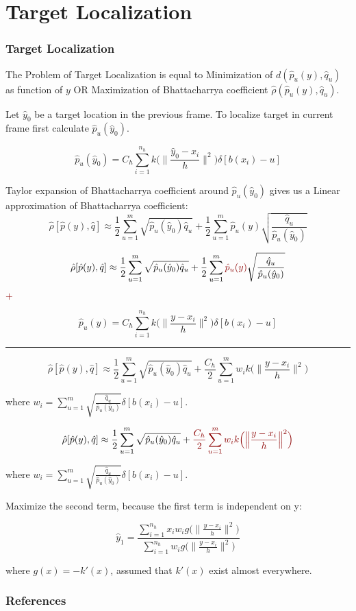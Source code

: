 \documentclass[hyperref={pdfpagelabels=false}]{beamer}
\begin{document}
\section{Target Localization}
\begin{frame}[allowframebreaks]
\frametitle{Target Localization}
The Problem of Target Localization is equal to {\color{darkred} Minimization of $d(\hat{p}_u(y),\hat{q}_u)$} as function of $y$ OR {\color{darkred} Maximization of Bhattacharrya coefficient} $\hat{\rho}(\hat{p}_u(y),\hat{q}_u)$.

\vspace{10pt}
Let $\hat{y}_0$ be a target location in the previous frame. To localize target in current frame first calculate $\hat{p}_u(\hat{y}_0)$.

	 $$ \hat{p}_u(\hat{y}_0) = C_h \sum_{i=1}^{n_h}k\Big(\Big\lVert\frac{ \hat{y}_0-x_i}{h}\Big\rVert^2\Big)\delta[b(x_i)-u]$$

\newpage

Taylor expansion of Bhattacharrya coefficient around $\hat{p}_u(\hat{y}_0)$ gives us a Linear approximation of Bhattacharrya coefficient: 
$$\hat{\rho}[\hat{p}(y), \hat{q}] \approx \frac{1}{2}\sum_{u=1}^{m}\sqrt{\hat{p}_u(\hat{y}_0) \hat{q}_u}+\frac{1}{2}\sum_{u=1}^{m}\hat{p}_u(y)\sqrt{\frac{\hat{q}_u}{\hat{p}_u(\hat{y}_0)}}$$

\newpage

$$\hat{\rho}[\hat{p}(y), \hat{q}] \approx \frac{1}{2}\sum_{u=1}^{m}\sqrt{\hat{p}_u(\hat{y}_0) \hat{q}_u}+\frac{1}{2}\sum_{u=1}^{m}{\color{darkred}\hat{p}_u(y)}\sqrt{\frac{\hat{q}_u}{\hat{p}_u(\hat{y}_0)}}$$

$\color{darkred} + $

$$ \hat{p}_u(y) = C_h \sum_{i=1}^{n_h}k\Big(\Big\lVert\frac{ y-x_i}{h}\Big\rVert^2\Big)\delta[b(x_i)-u]$$

\noindent\rule{11cm}{0.4pt}
$$\hat{\rho}[\hat{p}(y), \hat{q}] \approx \frac{1}{2}\sum_{u=1}^{m}\sqrt{\hat{p}_u(\hat{y}_0) \hat{q}_u}+\frac{C_h}{2}\sum_{u=1}^{m}w_i k\Big(\Big\lVert\frac{ y-x_i}{h}\Big\rVert^2\Big)$$

where $w_i = \sum_{u=1}^{m}\sqrt{\frac{\hat{q}_u}{\hat{p}_u(\hat{y}_0)}}\delta[b(x_i)-u]$.


\newpage

$$\hat{\rho}[\hat{p}(y), \hat{q}] \approx \frac{1}{2}\sum_{u=1}^{m}\sqrt{\hat{p}_u(\hat{y}_0) \hat{q}_u}+\color{darkred}\frac{C_h}{2}\sum_{u=1}^{m}w_i k\Big(\Big\lVert\frac{ y-x_i}{h}\Big\rVert^2\Big)$$

where $w_i = \sum_{u=1}^{m}\sqrt{\frac{\hat{q}_u}{\hat{p}_u(\hat{y}_0)}}\delta[b(x_i)-u]$.

Maximize the second term, because the first term is independent on y:

$$\hat{y}_1 = \frac{\sum_{i=1}^{n_h}x_iw_ig\Big(\Big\lVert\frac{ y-x_i}{h}\Big\rVert^2\Big)}{\sum_{i=1}^{n_h}w_ig\Big(\Big\lVert\frac{ y-x_i}{h}\Big\rVert^2\Big)}$$

where $g(x) = -k'(x)$, assumed that $k'(x)$ exist almost everywhere.

\end{frame}



\begin{frame}[allowframebreaks]
	\frametitle{References}
	\nocite{KernelBasedObjectTracking}
	
	
\end{frame}
\end{document}
